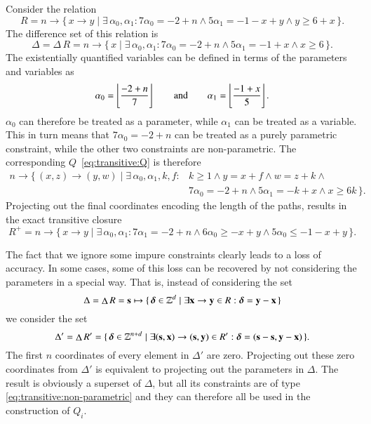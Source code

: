 \begin{example}
Consider the relation
$$
R =
n \to \{\, x \to y \mid \exists \, \alpha_0, \alpha_1: 7\alpha_0 = -2 + n \wedge 5\alpha_1 = -1 - x + y \wedge y \ge 6 + x \,\}
.
$$
The difference set of this relation is
$$
\Delta = \Delta \, R =
n \to \{\, x \mid \exists \, \alpha_0, \alpha_1: 7\alpha_0 = -2 + n \wedge 5\alpha_1 = -1 + x \wedge x \ge 6 \,\}
.
$$
The existentially quantified variables can be defined in terms
of the parameters and variables as
$$
\alpha_0 = \left\lfloor\frac{-2 + n}7\right\rfloor
\qquad
\text{and}
\qquad
\alpha_1 = \left\lfloor\frac{-1 + x}5\right\rfloor
.
$$
$\alpha_0$ can therefore be treated as a parameter,
while $\alpha_1$ can be treated as a variable.
This in turn means that $7\alpha_0 = -2 + n$ can be treated as
a purely parametric constraint, while the other two constraints are
non-parametric.
The corresponding $Q$~\eqref{eq:transitive:Q} is therefore
$$
\begin{aligned}
n \to \{\, (x,z) \to (y,w) \mid
\exists\, \alpha_0, \alpha_1, k, f : {} &
k \ge 1 \wedge
y = x + f \wedge
w = z + k \wedge {} \\
&
7\alpha_0 = -2 + n \wedge
5\alpha_1 = -k + x \wedge
x \ge 6 k
\,\}
.
\end{aligned}
$$
Projecting out the final coordinates encoding the length of the paths,
results in the exact transitive closure
$$
R^+ =
n \to \{\, x \to y \mid \exists \, \alpha_0, \alpha_1: 7\alpha_1 = -2 + n \wedge 6\alpha_0 \ge -x + y \wedge 5\alpha_0 \le -1 - x + y \,\}
.
$$
\end{example}

The fact that we ignore some impure constraints clearly leads
to a loss of accuracy.  In some cases, some of this loss can be recovered
by not considering the parameters in a special way.
That is, instead of considering the set
$$
\Delta = \diff R =
\vec s \mapsto
\{\, \vec \delta \in \Z^{d} \mid \exists \vec x \to \vec y \in R :
\vec \delta = \vec y - \vec x
\,\}
$$
we consider the set
$$
\Delta' = \diff R' =
\{\, \vec \delta \in \Z^{n+d} \mid \exists
(\vec s, \vec x) \to (\vec s, \vec y) \in R' :
\vec \delta = (\vec s - \vec s, \vec y - \vec x)
\,\}
.
$$
The first $n$ coordinates of every element in $\Delta'$ are zero.
Projecting out these zero coordinates from $\Delta'$ is equivalent
to projecting out the parameters in $\Delta$.
The result is obviously a superset of $\Delta$, but all its constraints
are of type \eqref{eq:transitive:non-parametric} and they can therefore
all be used in the construction of $Q_i$.

